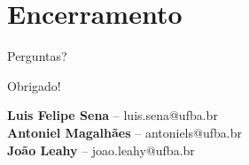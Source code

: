\documentclass[aspectratio=169,xcolor=table]{beamer}
\begin{document}
\section{Encerramento}
\begin{frame}{Perguntas?}
    \begin{center}
        \Huge Obrigado!
        \vspace{1cm}

        \normalsize
        \textbf{Luis Felipe Sena} -- luis.sena@ufba.br\\
        \textbf{Antoniel Magalhães} -- antoniels@ufba.br\\
        \textbf{João Leahy} -- joao.leahy@ufba.br
    \end{center}
\end{frame}
\end{document}
